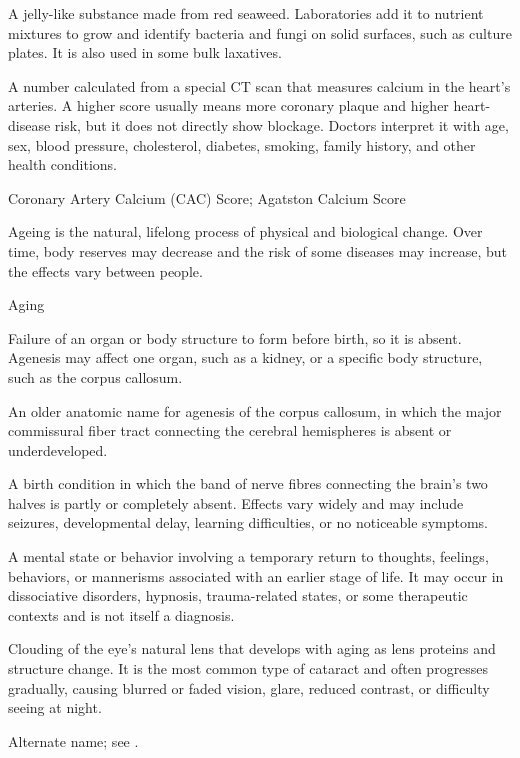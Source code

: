  A jelly-like substance made from red seaweed. Laboratories add it to nutrient mixtures to grow and identify bacteria and fungi on solid surfaces, such as culture plates. It is also used in some bulk laxatives.

 A number calculated from a special CT scan that measures calcium in the heart’s arteries. A higher score usually means more coronary plaque and higher heart-disease risk, but it does not directly show blockage. Doctors interpret it with age, sex, blood pressure, cholesterol, diabetes, smoking, family history, and other health conditions.

\synonyms
Coronary Artery Calcium (CAC) Score; Agatston Calcium Score

 Ageing is the natural, lifelong process of physical and biological change. Over time, body reserves may decrease and the risk of some diseases may increase, but the effects vary between people.

\synonyms
Aging

 Failure of an organ or body structure to form before birth, so it is absent. Agenesis may affect one organ, such as a kidney, or a specific body structure, such as the corpus callosum.

 An older anatomic name for agenesis of the corpus callosum, in which the major commissural fiber tract connecting the cerebral hemispheres is absent or underdeveloped.

 A birth condition in which the band of nerve fibres connecting the brain’s two halves is partly or completely absent. Effects vary widely and may include seizures, developmental delay, learning difficulties, or no noticeable symptoms.

 A mental state or behavior involving a temporary return to thoughts, feelings, behaviors, or mannerisms associated with an earlier stage of life. It may occur in dissociative disorders, hypnosis, trauma-related states, or some therapeutic contexts and is not itself a diagnosis.

 Clouding of the eye’s natural lens that develops with aging as lens proteins and structure change. It is the most common type of cataract and often progresses gradually, causing blurred or faded vision, glare, reduced contrast, or difficulty seeing at night.

 Alternate name; see .

